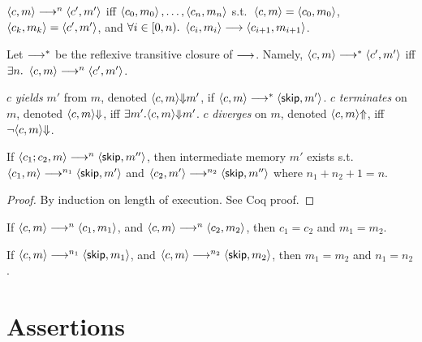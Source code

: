 $\Cfg(c,m) \sstepston n \Cfg(c',m')$ iff
$\Cfg(c_0,m_0),\dots,\Cfg(c_n,m_n)$
s.t.\ $\Cfg(c,m)=\Cfg(c_0,m_0)$,
$\Cfg(c_k,m_k)=\Cfg(c',m')$,
and $\forall i \in [0,n).\ \Cfg(c_i,m_i) \sstepsto \Cfg(c_{i+1},m_{i+1})$.


Let $\mathrel{\mathrel{\longrightarrow}^{\ast}}$ be the reflexive transitive closure of $\mathrel{\longrightarrow}$. Namely,
$\Cfg(c,m) \sstepstotrans \Cfg(c',m')$ iff
$\exists n.\ \Cfg(c,m) \sstepston n \Cfg(c',m')$.

\begin{definition}
    $c$ \emph{yields} $m'$ from $m$,
    denoted $\Yields(c,m,m')$,
    if $\Cfg(c,m) \sstepstotrans \Cfg(\Skip,m')$.
    $c$ \emph{terminates} on $m$, denoted $\Terminate(c,m)$,
    iff $\exists m'. \Yields(c,m,m')$.
    $c$ \emph{diverges} on $m$, denoted $\Diverge(c,m)$,
    iff $\neg \Terminate(c,m)$.
\end{definition}

\begin{lemma}
    If $\Cfg(c_1; c_2, m) \sstepston n \Cfg(\Skip, m'')$, 
    then intermediate memory $m'$ exists s.t.\
    $\Cfg(c_1, m) \sstepston{n_1} \Cfg(\Skip, m')$
    and $\Cfg(c_2, m') \sstepston{n_2} \Cfg(\Skip, m'')$
    where $n_1+n_2+1=n$.
\end{lemma}
\begin{proof}
    By induction on length of execution. See Coq proof.
\end{proof}

\begin{lemma}
    If $\Cfg(c,m) \sstepston n \Cfg(c_1,m_1)$,
    and $\Cfg(c,m) \sstepston n \Cfg(c_2,m_2)$,
    then $c_1 = c_2$ and $m_1 = m_2$.
\end{lemma}

\begin{lemma}
    If $\Cfg(c,m) \sstepston{n_1} \Cfg(\Skip,m_1)$,
    and $\Cfg(c,m) \sstepston{n_2} \Cfg(\Skip,m_2)$,
    then $m_1 = m_2$ and $n_1 = n_2$.
\end{lemma}

\section{Assertions}

\newcommand*{\domivar}{\mathsf{IVar}}

\newcommand*{\DomAssert}{\mathsf{Assrt}}
\newcommand*{\DomAexpv}{\mathsf{Aexpv}}

